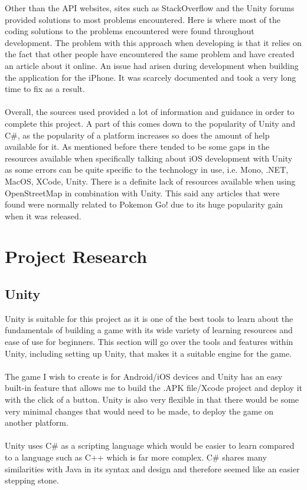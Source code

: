 \documentclass[a4paper]{report}
\begin{document}
Other than the API websites, sites such as StackOverflow and the Unity forums provided solutions to most problems encountered. Here is where most of the coding solutions to the problems encountered were found throughout development. The problem with this approach when developing is that it relies on the fact that other people have encountered the same problem and have created an article about it online. An issue had arisen during development when building the application for the iPhone. It was scarcely documented and took a very long time to fix as a result. 
\\\\
Overall, the sources used provided a lot of information and guidance in order to complete this project. A part of this comes down to the popularity of Unity and C\#, as the popularity of a platform increases so does the amount of help available for it. As mentioned before there tended to be some gaps in the resources available when specifically talking about iOS development with Unity as some errors can be quite specific to the technology in use, i.e. Mono, .NET, MacOS, XCode, Unity. There is a definite lack of resources available when using OpenStreetMap in combination with Unity. This said any articles that were found were normally related to Pokemon Go! due to its huge popularity gain when it was released.
\chapter{Project Research}
\section{Unity}
Unity is suitable for this project as it is one of the best tools to learn about the fundamentals of building a game with its wide variety of learning resources and ease of use for beginners. This section will go over the tools and features within Unity, including setting up Unity, that makes it a suitable engine for the game.
\\\\ 
The game I wish to create is for Android/iOS devices and Unity has an easy built-in feature that allows me to build the .APK file/Xcode project and deploy it with the click of a button. Unity is also very flexible in that there would be some very minimal changes that would need to be made, to deploy the game on another platform.
\\\\
Unity uses C\# as a scripting language which would be easier to learn compared to a language such as C++ which is far more complex. C\# shares many similarities with Java in its syntax and design and therefore seemed like an easier stepping stone.
\end{document}

